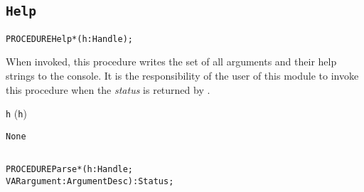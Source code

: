 \subsection{\texttt{Help}}\label{GetOpt:Help}
\begin{alltt}
PROCEDURE Help*(h : Handle);
\end{alltt}

\begin{semantics}
When invoked, this procedure writes the set of all arguments and their
help strings to the console.  It is the responsibility of the user of
this module to invoke this procedure when the
 \emph{status} is returned by
.
\end{semantics}

\begin{precondition}
\texttt{h} \neq \nil \logicaland \valid(\texttt{h}\deref)
\end{precondition}

\begin{postcondition}
\texttt{None}
\end{postcondition}

\subsection{\texttt{}}\label{GetOpt:Parse}
\begin{alltt}
PROCEDURE Parse*(    h        : Handle;
                 VAR argument : ArgumentDesc) : Status;
\end{alltt}


